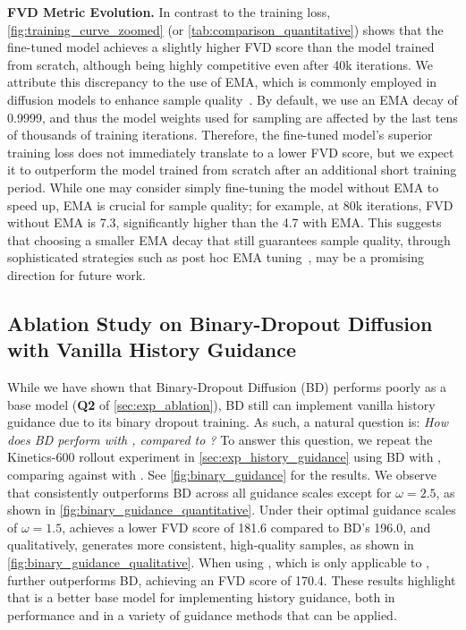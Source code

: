 \textbf{FVD Metric Evolution.} In contrast to the training loss, \cref{fig:training_curve_zoomed} (or \cref{tab:comparison_quantitative}) shows that the fine-tuned model achieves a slightly higher FVD score than the model trained from scratch, although being highly competitive even after 40k iterations. We attribute this discrepancy to the use of EMA, which is commonly employed in diffusion models to enhance sample quality~\cite{ddpm,dhariwal2021diffusion}. By default, we use an EMA decay of 0.9999, and thus the model weights used for sampling are affected by the last tens of thousands of training iterations. Therefore, the fine-tuned model's superior training loss does not immediately translate to a lower FVD score, but we expect it to outperform the model trained from scratch after an additional short training period. While one may consider simply fine-tuning the model without EMA to speed up, EMA is crucial for sample quality; for example, at 80k iterations, FVD without EMA is 7.3, significantly higher than the 4.7 with EMA. This suggests that choosing a smaller EMA decay that still guarantees sample quality, through sophisticated strategies such as post hoc EMA tuning~\cite{karras2024analyzing}, may be a promising direction for future work.


\subsection{Ablation Study on Binary-Dropout Diffusion with Vanilla History Guidance}



While we have shown that Binary-Dropout Diffusion (BD) performs poorly as a base model (\textbf{Q2} of \cref{sec:exp_ablation}), BD still can implement vanilla history guidance due to its binary dropout training. As such, a natural question is: \emph{How does BD perform with \HGv, compared to \mtd?} To answer this question, we repeat the Kinetics-600 rollout experiment in \cref{sec:exp_history_guidance} using BD with \HGv, comparing against \mtd with \HG. See \cref{fig:binary_guidance} for the results. We observe that \mtd consistently outperforms BD across all guidance scales except for $\omega = 2.5$, as shown in \cref{fig:binary_guidance_quantitative}. Under their optimal guidance scales of $\omega = 1.5$, \mtd achieves a lower FVD score of 181.6 compared to BD's 196.0, and qualitatively, generates more consistent, high-quality samples, as shown in \cref{fig:binary_guidance_qualitative}. When using \HGf, which is only applicable to \mtd, \mtd further outperforms BD, achieving an FVD score of 170.4. These results highlight that \mtd is a better base model for implementing history guidance, both in performance and in a variety of guidance methods that can be applied.

